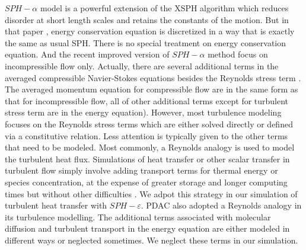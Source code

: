 \documentclass[10pt,a4paper]{article}
\begin{document}
$SPH-\alpha$ model \cite{monaghan2002sph} is a powerful extension of the XSPH algorithm which reduces disorder at short length scales and retains the constants of the motion. But in that paper \cite{monaghan2002sph}, energy conservation equation is discretized in a way that is exactly the same as usual SPH. There is no special treatment on energy conservation equation. And the recent improved version \cite{monaghan2011turbulence} of $SPH-\alpha$ method focus on incompressible flow only. Actually, there are several additional terms in the averaged compressible Navier-Stokes equations besides the Reynolds stress term \cite{NASACompressibleTurbulence}. The averaged momentum equation for compressible flow are in the same form as that for incompressible flow, all of other additional terms except for turbulent stress term are in the energy equation). However, most turbulence modeling focuses on the Reynolds stress terms which are either solved directly or defined via a constitutive relation. Less attention is typically given to the other terms that need to be modeled. Most commonly, a Reynolds analogy is used to model the turbulent heat flux. Simulations of heat transfer or other scalar transfer in turbulent flow simply involve adding transport terms for thermal energy or species concentration, at the expense of greater storage and longer computing times but without other difficulties \cite{cebeci2013analysis}. We adpot this strategy in our simulation of turbulent heat transfer with $SPH-\varepsilon$. PDAC \cite{neri2003multiparticle} also adopted a Reynolds analogy in its turbulence modelling. The additional terms associated with molecular diffusion and turbulent transport in the energy equation are either modeled in different ways or neglected sometimes\cite{NASACompressibleTurbulence}. We neglect these terms in our simulation.\\
\end{document}
